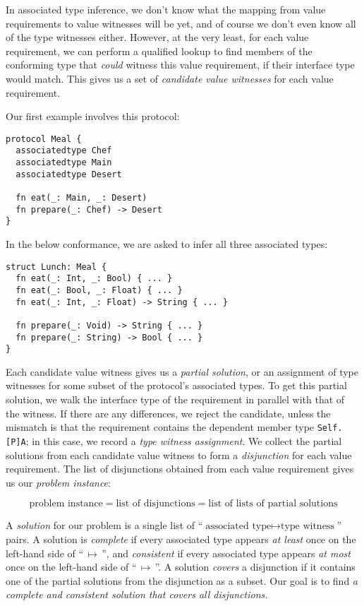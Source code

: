 \documentclass[../generics]{subfiles}
\begin{document}
In associated type inference, we don't know what the mapping from value requirements to value witnesses will be yet, and of course we don't even know all of the type witnesses either. However, at the very least, for each value requirement, we can perform a qualified lookup to find members of the conforming type that \emph{could} witness this value requirement, if their interface type would match. This gives us a set of \emph{candidate value witnesses} for each value requirement. 

\begin{example}\label{assoc type inference example 1}
Our first example involves this protocol:
\begin{Verbatim}
protocol Meal {
  associatedtype Chef
  associatedtype Main
  associatedtype Desert

  fn eat(_: Main, _: Desert)
  fn prepare(_: Chef) -> Desert
}
\end{Verbatim}
In the below conformance, we are asked to infer all three associated types:
\begin{Verbatim}
struct Lunch: Meal {
  fn eat(_: Int, _: Bool) { ... }
  fn eat(_: Bool, _: Float) { ... }
  fn eat(_: Int, _: Float) -> String { ... }

  fn prepare(_: Void) -> String { ... }
  fn prepare(_: String) -> Bool { ... }
}
\end{Verbatim}
\end{example}

Each candidate value witness gives us a \emph{partial solution}, or an assignment of type witnesses for some subset of the protocol's associated types. To get this partial solution, we walk the interface type of the requirement in parallel with that of the witness. If there are any differences, we reject the candidate, unless the mismatch is that the requirement contains the dependent member type \texttt{Self.[P]A}; in this case, we record a \emph{type witness assignment}. We collect the partial solutions from each candidate value witness to form a \emph{disjunction} for each value requirement. The list of disjunctions obtained from each value requirement gives us our \emph{problem instance}:
\begin{ceqn}
\[
\text{problem instance} = \text{list of disjunctions} = \text{list of lists of partial solutions}
\]
\end{ceqn}

A \emph{solution} for our problem is a single list of ``$\text{associated type} \mapsto \text{type witness}$'' pairs. A solution is \emph{complete} if every associated type appears \emph{at least} once on the left-hand side of ``$\,\mapsto\,$'', and \emph{consistent} if every associated type appears \emph{at most} once on the left-hand side of ``$\,\mapsto\,$''. A solution \emph{covers} a disjunction if it contains one of the partial solutions from the disjunction as a subset. Our goal is to find \textsl{a complete and consistent solution that covers all disjunctions.}
\end{document}
